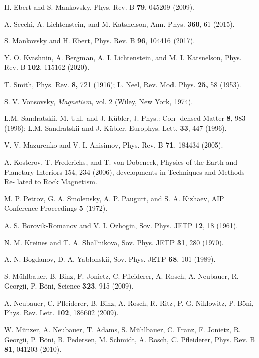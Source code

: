 \documentclass[aps,prl,twocolumn,showpacs,amsmath,amssymb]{revtex4-1}
\begin{document}
\begin{thebibliography}{199}
 H. Ebert and S. Mankovsky, Phys. Rev. B  {\bf 79}, 045209 (2009).

 A. Secchi, A. Lichtenstein, and M. Katsnelson, Ann. Phys. {\bf 360}, 61 (2015).

 S. Mankovsky and H. Ebert, Phys. Rev. B {\bf 96}, 104416 (2017).

 Y. O. Kvashnin, A. Bergman, A. I. Lichtenstein, and M. I. Katsnelson, Phys. Rev. B {\bf 102}, 115162 (2020).

  T. Smith,
Phys. Rev. {\bf 8,} 721 (1916); L. Neel, Rev. Mod. Phys. {\bf 25,} 58 (1953).

 S. V. Vonsovsky, {\it Magnetism}, vol. 2
(Wiley, New York, 1974).

L.M. Sandratskii, M. Uhl, and J. K\"ubler, J. Phys.: Con-
densed Matter {\bf 8}, 983 (1996); L.M. Sandratskii and J.
K\"ubler, Europhys. Lett. {\bf 33}, 447 (1996).

V. V. Mazurenko and V. I. Anisimov, Phys. Rev. B {\bf 71}, 184434 (2005).

 A. Kosterov, T. Frederichs, and T. von Dobeneck, Physics of the Earth and Planetary Interiors 154, 234 (2006), developments in Techniques and Methods Re- lated to Rock Magnetism.

M. P. Petrov, G. A. Smolensky, A. P. Paugurt, and S. A.
Kizhaev, AIP Conference Proceedings {\bf 5} (1972).

A. S. Borovik-Romanov and V. I. Ozhogin, Sov. Phys.
JETP {\bf 12}, 18 (1961).

N. M. Kreines and T. A. Shal'nikova, Sov. Phys.
JETP {\bf 31}, 280 (1970).

A. N. Bogdanov, D. A. Yablonskii, Sov. Phys. JETP {\bf 68}, 101 (1989).

S. M\"uhlbauer, B. Binz, F. Jonietz, C. Pfleiderer, A. Rosch, A. Neubauer, R. Georgii, P. B\"oni, Science {\bf 323}, 915 (2009).

A. Neubauer, C. Pfleiderer, B. Binz, A. Rosch, R. Ritz, P. G. Niklowitz, P. B\"oni, 
Phys. Rev. Lett. {\bf 102}, 186602 (2009).

W. M\"unzer, A. Neubauer, T. Adams, S. M\"uhlbauer, C. Franz, F. Jonietz, R. Georgii, P. B\"oni, B. Pedersen, M. Schmidt, A. Rosch, C. Pfleiderer, Phys. Rev. B {\bf 81}, 041203 (2010).


\end{thebibliography}
\end{document}
